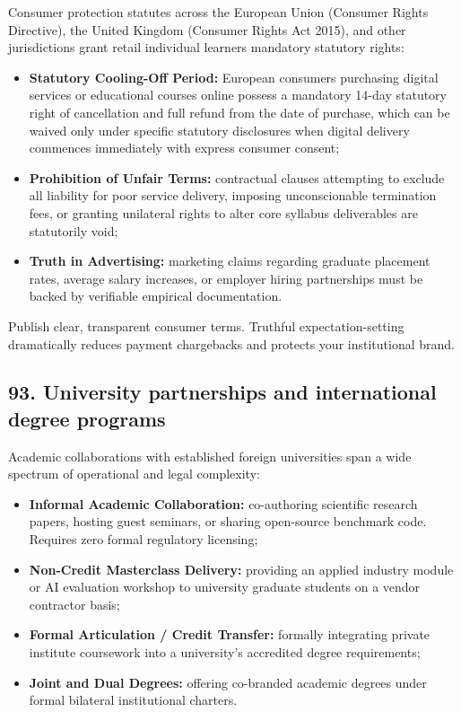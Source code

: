 Consumer protection statutes across the European Union (Consumer Rights Directive), the United Kingdom (Consumer Rights Act 2015), and other jurisdictions grant retail individual learners mandatory statutory rights:
\begin{itemize}
    \item \textbf{Statutory Cooling-Off Period:} European consumers purchasing digital services or educational courses online possess a mandatory 14-day statutory right of cancellation and full refund from the date of purchase, which can be waived only under specific statutory disclosures when digital delivery commences immediately with express consumer consent;
    \item \textbf{Prohibition of Unfair Terms:} contractual clauses attempting to exclude all liability for poor service delivery, imposing unconscionable termination fees, or granting unilateral rights to alter core syllabus deliverables are statutorily void;
    \item \textbf{Truth in Advertising:} marketing claims regarding graduate placement rates, average salary increases, or employer hiring partnerships must be backed by verifiable empirical documentation.
\end{itemize}
Publish clear, transparent consumer terms. Truthful expectation-setting dramatically reduces payment chargebacks and protects your institutional brand.

\subsection{93. University partnerships and international degree programs}

Academic collaborations with established foreign universities span a wide spectrum of operational and legal complexity:
\begin{itemize}
    \item \textbf{Informal Academic Collaboration:} co-authoring scientific research papers, hosting guest seminars, or sharing open-source benchmark code. Requires zero formal regulatory licensing;
    \item \textbf{Non-Credit Masterclass Delivery:} providing an applied industry module or AI evaluation workshop to university graduate students on a vendor contractor basis;
    \item \textbf{Formal Articulation / Credit Transfer:} formally integrating private institute coursework into a university's accredited degree requirements;
    \item \textbf{Joint and Dual Degrees:} offering co-branded academic degrees under formal bilateral institutional charters.
\end{itemize}

